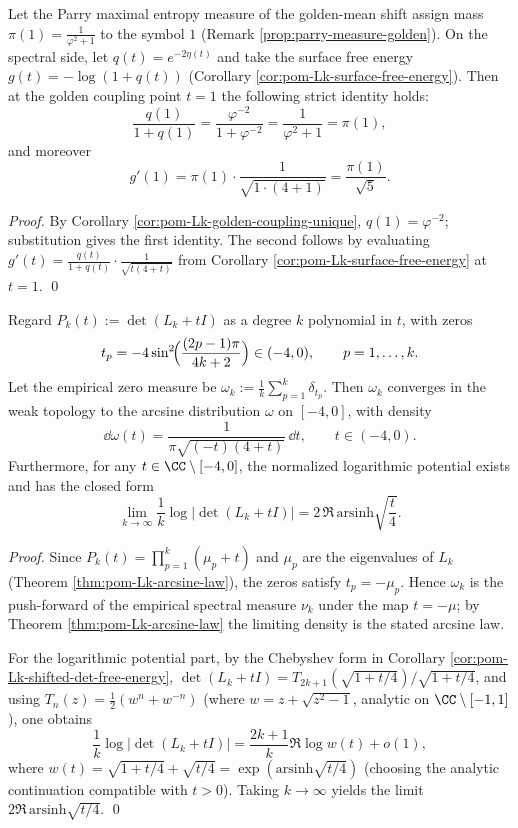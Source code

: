 \begin{corollary}[Boundary entropy derivative and Parry mass exact coupling: homologous closure at \texorpdfstring{\(t=1\)}{t=1}]\label{cor:pom-Lk-t1-parry-surface-derivative}
Let the Parry maximal entropy measure of the golden-mean shift assign mass
\(
\pi(1)=\frac{1}{\varphi^2+1}
\)
to the symbol \(1\) (Remark \ref{prop:parry-measure-golden}).
On the spectral side, let \(q(t)=e^{-2\eta(t)}\) and take the surface free energy \(g(t)=-\log(1+q(t))\) (Corollary \ref{cor:pom-Lk-surface-free-energy}).
Then at the golden coupling point \(t=1\) the following strict identity holds:
\[
\frac{q(1)}{1+q(1)}=\frac{\varphi^{-2}}{1+\varphi^{-2}}=\frac{1}{\varphi^2+1}=\pi(1),
\]
and moreover
\[
g'(1)=\pi(1)\cdot\frac{1}{\sqrt{1\cdot(4+1)}}=\frac{\pi(1)}{\sqrt5}.
\]
\end{corollary}
\begin{proof}
By Corollary \ref{cor:pom-Lk-golden-coupling-unique}, \(q(1)=\varphi^{-2}\); substitution gives the first identity.
The second follows by evaluating
\(
g'(t)=\frac{q(t)}{1+q(t)}\cdot \frac{1}{\sqrt{t(4+t)}}
\)
from Corollary \ref{cor:pom-Lk-surface-free-energy} at \(t=1\). \qed
\end{proof}

\begin{theorem}\label{thm:pom-Lk-fisher-zeros-arcsine}
Regard \(P_k(t):=\det(L_k+tI)\) as a degree \(k\) polynomial in \(t\), with zeros
\[
t_p=-4\sin^2\!\Bigl(\frac{(2p-1)\pi}{4k+2}\Bigr)\in(-4,0),
\qquad p=1,\dots,k.
\]
Let the empirical zero measure be
\(
\omega_k:=\frac1k\sum_{p=1}^k\delta_{t_p}
\).
Then \(\omega_k\) converges in the weak topology to the arcsine distribution \(\omega\) on \([-4,0]\), with density
\[
\dd\omega(t)=\frac{1}{\pi\sqrt{(-t)(4+t)}}\,\dd t,\qquad t\in(-4,0).
\]
Furthermore, for any \(t\in\CC\setminus[-4,0]\), the normalized logarithmic potential exists and has the closed form
\[
\lim_{k\to\infty}\frac{1}{k}\log\bigl|\det(L_k+tI)\bigr|
=2\,\Re\,\mathrm{arsinh}\sqrt{\frac{t}{4}}.
\]
\end{theorem}
\begin{proof}
Since \(P_k(t)=\prod_{p=1}^k(\mu_p+t)\) and \(\mu_p\) are the eigenvalues of \(L_k\) (Theorem \ref{thm:pom-Lk-arcsine-law}), the zeros satisfy \(t_p=-\mu_p\).
Hence \(\omega_k\) is the push-forward of the empirical spectral measure \(\nu_k\) under the map \(t=-\mu\); by Theorem \ref{thm:pom-Lk-arcsine-law} the limiting density is the stated arcsine law.

For the logarithmic potential part, by the Chebyshev form in Corollary \ref{cor:pom-Lk-shifted-det-free-energy},
\(
\det(L_k+tI)=T_{2k+1}(\sqrt{1+t/4})/\sqrt{1+t/4}
\),
and using \(T_n(z)=\frac12(w^n+w^{-n})\) (where \(w=z+\sqrt{z^2-1}\), analytic on \(\CC\setminus[-1,1]\)), one obtains
\[
\frac{1}{k}\log|\det(L_k+tI)|
=\frac{2k+1}{k}\Re\log w(t)+o(1),
\]
where \(w(t)=\sqrt{1+t/4}+\sqrt{t/4}=\exp(\mathrm{arsinh}\sqrt{t/4})\) (choosing the analytic continuation compatible with \(t>0\)).
Taking \(k\to\infty\) yields the limit \(2\Re\,\mathrm{arsinh}\sqrt{t/4}\). \qed
\end{proof}

